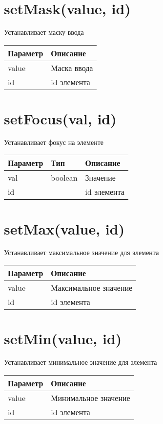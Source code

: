 \hypertarget{setmaskvalue-id}{%
\section{setMask(value, id)}\label{setmaskvalue-id}}

Устанавливает маску ввода


\begin{longtable}[]{@{}ll@{}}
\toprule
Параметр & Описание\tabularnewline
\midrule
\endhead
value & Маска ввода\tabularnewline
id & id элемента\tabularnewline
\bottomrule
\end{longtable}

\hypertarget{setfocusval-id}{%
\section{setFocus(val, id)}\label{setfocusval-id}}

Устанавливает фокус на элементе


\begin{longtable}[]{@{}lll@{}}
\toprule
Параметр & Тип & Описание\tabularnewline
\midrule
\endhead
val & boolean & Значение\tabularnewline
id & & id элемента\tabularnewline
\bottomrule
\end{longtable}

\hypertarget{setmaxvalue-id}{%
\section{setMax(value, id)}\label{setmaxvalue-id}}

Устанавливает максимальное значение для элемента


\begin{longtable}[]{@{}ll@{}}
\toprule
Параметр & Описание\tabularnewline
\midrule
\endhead
value & Максимальное значение\tabularnewline
id & id элемента\tabularnewline
\bottomrule
\end{longtable}

\hypertarget{setminvalue-id}{%
\section{setMin(value, id)}\label{setminvalue-id}}

Устанавливает минимальное значение для элемента


\begin{longtable}[]{@{}ll@{}}
\toprule
Параметр & Описание\tabularnewline
\midrule
\endhead
value & Минимальное значение\tabularnewline
id & id элемента\tabularnewline
\bottomrule
\end{longtable}

